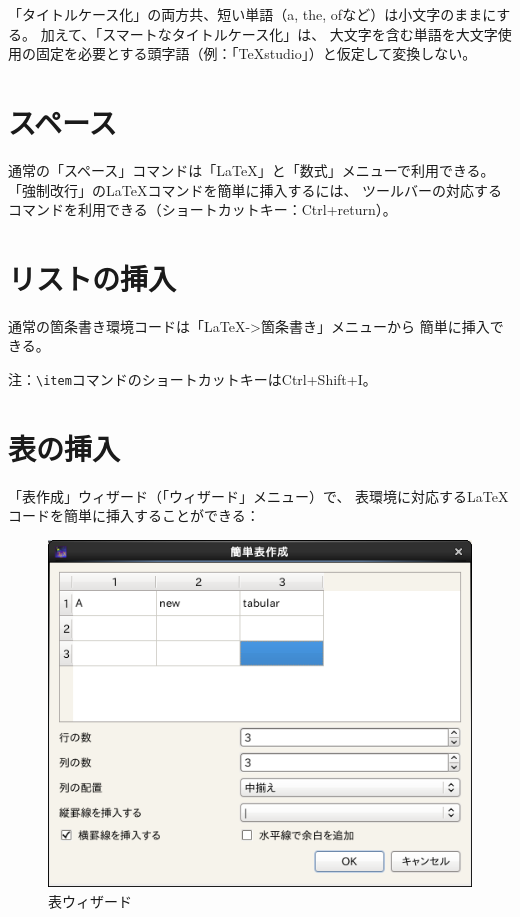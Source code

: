 「タイトルケース化」の両方共、短い単語（a, the, ofなど）は小文字のままにする。
加えて、「スマートなタイトルケース化」は、
大文字を含む単語を大文字使用の固定を必要とする頭字語（例：「TeXstudio」）と仮定して変換しない。

\section{スペース}

通常の「スペース」コマンドは「LaTeX」と「数式」メニューで利用できる。
「強制改行」のLaTeXコマンドを簡単に挿入するには、
ツールバーの対応するコマンドを利用できる（ショートカットキー：Ctrl+return）。

\section{リストの挿入}

通常の箇条書き環境コードは「LaTeX-\textgreater{}箇条書き」メニューから
簡単に挿入できる。

注：\verb+\item+コマンドのショートカットキーはCtrl+Shift+I。

\section{表の挿入}

「表作成」ウィザード（「ウィザード」メニュー）で、
表環境に対応するLaTeXコードを簡単に挿入することができる：

\begin{figure}[htbp]
  \centering
  \includegraphics{doc7.png}
  \caption{表ウィザード}
\end{figure}

